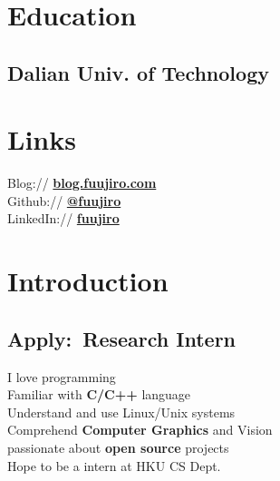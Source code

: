\documentclass[]{deedy-resume-openfont}
\begin{document}
%
%
\lastupdated

%
%

%
%

\begin{minipage}[t]{0.25\textwidth} 


\section{Education} 

\subsection{Dalian Univ. of Technology}
\sectionsep


\section{Links}
\sectionsep
Blog://  \href{https://blog.fuujiro.com/}{\bf blog.fuujiro.com} \\  
Github:// \href{https://github.com/fuujiro}{\bf @fuujiro} \\
LinkedIn://  \href{https://www.linkedin.com/in/fuujiro}{\bf fuujiro} \\


\section{Introduction}
\subsection{Apply:\  Research Intern}
I love programming \\
Familiar with \textbf{C/C++} language \\
Understand and use Linux/Unix systems \\
Comprehend \textbf{Computer Graphics} and Vision \\
passionate about \textbf{open source} projects \\
Hope to be a intern at HKU CS Dept. \\
\sectionsep


\end{minipage}
\end{document}

